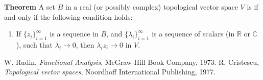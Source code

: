 \documentclass[12pt]{article}
\newcommand{\sR}[0]{\mathbb{R}}
\begin{document}
{\bf Theorem} \cite{rudin_fap, cristescu}
A set $B$ in a real (or possibly complex) 
topological vector space $V$ 
is  if and only if the
 following condition holds: 
 \begin{enumerate}
 \item[] If $\{z_i\}_{i=1}^\infty$ is a sequence in $B$, and $\{\lambda_i\}_{i=1}^\infty$
 is a sequence of scalars (in $\sR$ or $\mathbb{C}$), 
 such that $\lambda_i \to 0$, then $\lambda_i z_i\to 0$ in $V$.
 \end{enumerate}
 
 \begin{thebibliography}{9}
 W. Rudin, \emph{Functional Analysis},
 McGraw-Hill Book Company, 1973.
 R. Cristescu, \emph{Topological vector spaces},
Noordhoff International Publishing, 1977.
 \end{thebibliography}
\end{document}
